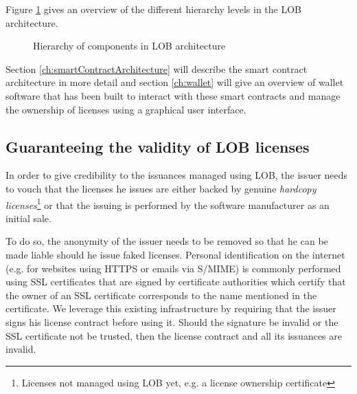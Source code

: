 \documentclass[a4paper]{article}
\begin{document}
Figure \ref{fig:smartContractHierarchy} gives an overview of the different hierarchy levels in the LOB architecture.

\begin{figure}
  \centering
  \caption{Hierarchy of components in LOB architecture}
  \label{fig:smartContractHierarchy}
\end{figure}


Section \ref{ch:smartContractArchitecture} will describe the smart contract architecture in more detail and section \ref{ch:wallet} will give an overview of wallet software that has been built to interact with these smart contracts and manage the ownership of licenses using a graphical user interface.





\subsection{Guaranteeing the validity of LOB licenses}
\label{ch:licenseValidityOverview}

In order to give credibility to the issuances managed using LOB, the issuer needs to vouch that the licenses he issues are either backed by genuine \emph{hardcopy licenses}\footnote{Licenses not managed using LOB yet, e.g. a license ownership certificate} or that the issuing is performed by the software manufacturer as an initial sale. 

To do so, the anonymity of the issuer needs to be removed so that he can be made liable should he issue faked licenses. Personal identification on the internet (e.g. for websites using HTTPS or emails via S/MIME) is commonly performed using SSL certificates that are signed by certificate authorities which certify that the owner of an SSL certificate corresponds to the name mentioned in the certificate.
We leverage this existing infrastructure by requiring that the issuer signs his license contract before using it. Should the signature be invalid or the SSL certificate not be trusted, then the license contract and all its issuances are invalid.
\end{document}
